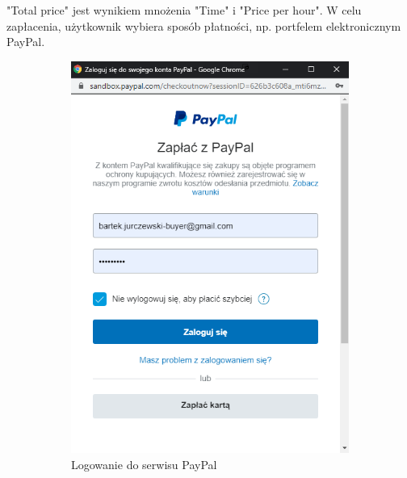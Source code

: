 \documentclass[12pt]{article}
\numberwithin{figure}{section}
\begin{document}
\begin{sloppypar}
"Total price" jest wynikiem mnożenia "Time" i "Price per hour". W celu zapłacenia, użytkownik wybiera sposób płatności, np. portfelem elektronicznym PayPal.

\begin{figure}[h]
    \centering
    \begin{subfigure}{.5\textwidth}
      \centering
      \includegraphics[width=.9\linewidth]{images/chapter_4/pay1.png}
      \caption{Logowanie do serwisu PayPal}
      \label{fig:paypal1}
    \end{subfigure}%
    \begin{subfigure}{.5\textwidth}
      \centering

\end{subfigure}
\end{figure}
\end{sloppypar}
\end{document}
